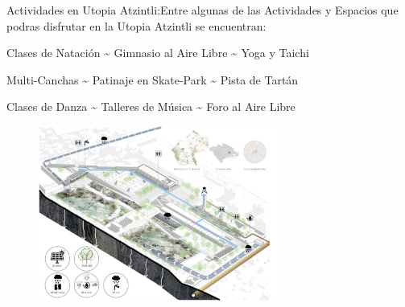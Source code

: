 \documentclass[letter]{ourGreenwayBrand}
\begin{document}
Actividades en Utopia Atzintli:Entre algunas de las Actividades y Espacios que podras disfrutar en la Utopia Atzintli se encuentran:

Clases de Natación \textasciitilde{} Gimnasio al Aire Libre \textasciitilde{} Yoga y Taichi

Multi-Canchas \textasciitilde{} Patinaje en Skate-Park \textasciitilde{} Pista de Tartán

Clases de Danza \textasciitilde{} Talleres de Música \textasciitilde{} Foro al Aire Libre

\begin{figure}[htbp]
  \centering
  \includegraphics[width=0.7\textwidth]{images/18-arquine-castro-quebradora-1024x749-1.jpg}
\end{figure}

\vspace{2em}
\end{document}
